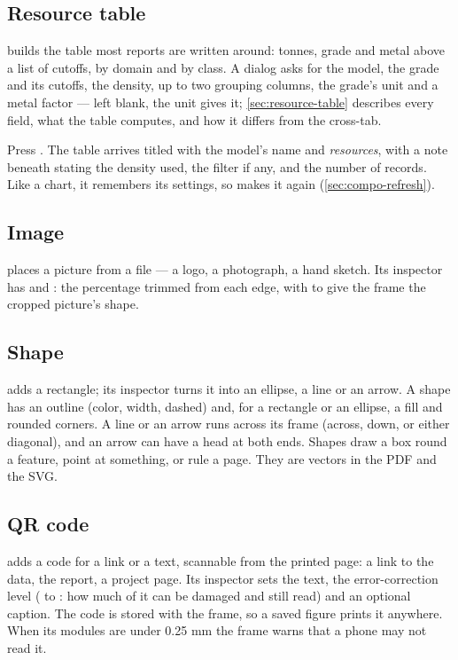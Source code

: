 \subsection{Resource table}\label{sec:compo-resource}

 builds the table most reports are written around: tonnes, grade and metal above a list of cutoffs, by domain and by class. A dialog asks for the model, the grade and its cutoffs, the density, up to two grouping columns, the grade's unit and a metal factor — left blank, the unit gives it; \cref{sec:resource-table} describes every field, what the table computes, and how it differs from the cross-tab.

Press . The table arrives titled with the model's name and \emph{resources}, with a note beneath stating the density used, the filter if any, and the number of records. Like a chart, it remembers its settings, so  makes it again (\cref{sec:compo-refresh}).

\subsection{Image}

 places a picture from a file — a logo, a photograph, a hand sketch. Its inspector has  and : the percentage trimmed from each edge, with  to give the frame the cropped picture's shape.

\subsection{Shape}

 adds a rectangle; its inspector turns it into an ellipse, a line or an arrow. A shape has an outline (color, width, dashed) and, for a rectangle or an ellipse, a fill and rounded corners. A line or an arrow runs across its frame (across, down, or either diagonal), and an arrow can have a head at both ends. Shapes draw a box round a feature, point at something, or rule a page. They are vectors in the PDF and the SVG.

\subsection{QR code}

 adds a code for a link or a text, scannable from the printed page: a link to the data, the report, a project page. Its inspector sets the text, the error-correction level ( to : how much of it can be damaged and still read) and an optional caption. The code is stored with the frame, so a saved figure prints it anywhere. When its modules are under 0.25 mm the frame warns that a phone may not read it.

